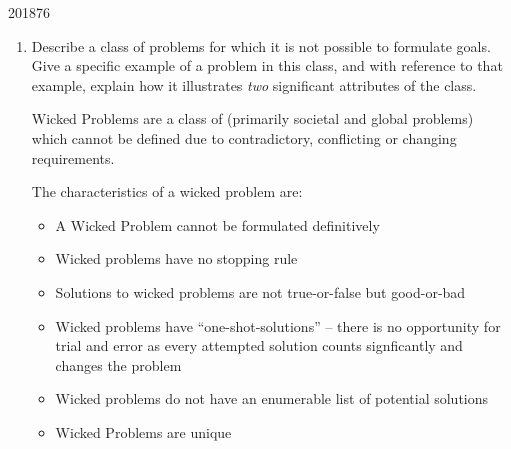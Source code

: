 \documentclass[10pt,\jkfside,a4paper]{article}
\begin{document}
\begin{examquestion}{2018}{7}{6}
\begin{enumerate}
\begin{itemize}
\end{itemize}

\item Describe a class of problems for which it is not possible to formulate
goals. Give a specific example of a problem in this class, and with
reference to that example, explain how it illustrates \textit{two}
significant attributes of the class.

Wicked Problems are a class of (primarily societal and global problems)
which cannot be defined due to contradictory, conflicting or changing
requirements.

The characteristics of a wicked problem are:

\begin{itemize}

\item A Wicked Problem cannot be formulated definitively

\item Wicked problems have no stopping rule

\item Solutions to wicked problems are not true-or-false but good-or-bad

\item Wicked problems have ``one-shot-solutions'' -- there is no opportunity
for trial and error as every attempted solution counts signficantly and
changes the problem

\item Wicked problems do not have an enumerable list of potential solutions

\item Wicked Problems are unique


\end{itemize}
\end{enumerate}
\end{examquestion}
\end{document}
